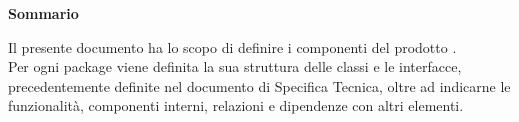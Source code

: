 \Large{\textbf{Sommario}}\\
{
\normalsize
	\begin{center}	{
Il presente documento ha lo scopo di definire i componenti del prodotto \textbf{\mytalk}.\\
Per ogni package viene definita la sua struttura delle classi e le interfacce, precedentemente definite nel documento di Specifica Tecnica, oltre ad indicarne le funzionalità, componenti interni, relazioni e dipendenze con altri elementi.
	}
	\end{center}
}

